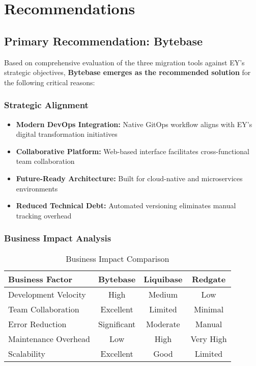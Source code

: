 \section{Recommendations}

\subsection{Primary Recommendation: Bytebase}

Based on comprehensive evaluation of the three migration tools against EY's strategic objectives, \textbf{Bytebase emerges as the recommended solution} for the following critical reasons:

\subsubsection{Strategic Alignment}
\begin{itemize}
    \item \textbf{Modern DevOps Integration:} Native GitOps workflow aligns with EY's digital transformation initiatives
    \item \textbf{Collaborative Platform:} Web-based interface facilitates cross-functional team collaboration
    \item \textbf{Future-Ready Architecture:} Built for cloud-native and microservices environments
    \item \textbf{Reduced Technical Debt:} Automated versioning eliminates manual tracking overhead
\end{itemize}

\subsubsection{Business Impact Analysis}
\begin{table}[H]
\centering
\begin{tabular}{|l|c|c|c|}
\hline
\textbf{Business Factor} & \textbf{Bytebase} & \textbf{Liquibase} & \textbf{Redgate} \\
\hline
Development Velocity & High & Medium & Low \\
\hline
Team Collaboration & Excellent & Limited & Minimal \\
\hline
Error Reduction & Significant & Moderate & Manual \\
\hline
Maintenance Overhead & Low & High & Very High \\
\hline
Scalability & Excellent & Good & Limited \\
\hline
\end{tabular}
\caption{Business Impact Comparison}
\label{tab:business}
\end{table}

